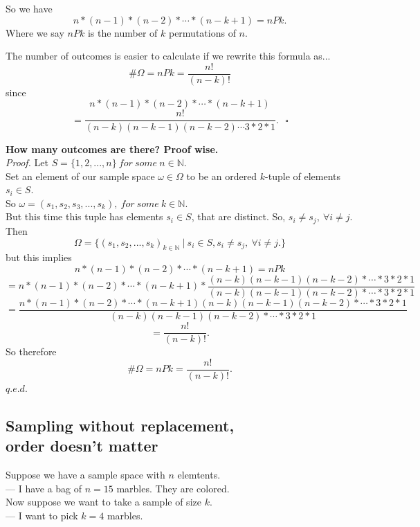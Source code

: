\documentclass[12pt]{book}
\begin{document}
So we have $$n*(n-1)*(n-2)* \cdots *(n-k+1) = nPk.$$
Where we say $nPk$ is the number of $k$ permutations of $n$.

The number of outcomes is easier to calculate if we rewrite this formula as...
$$\#\Omega = nPk = \frac{n!}{(n-k)!}$$
since 
$$n*(n-1)*(n-2)* \cdots *(n-k+1)$$
$$ = \frac{n!}{(n-k)(n-k-1)(n-k-2)\cdots 3*2*1}.~~~\square$$

\noindent \textbf{How many outcomes are there? Proof wise.}\\
\textit{Proof.}
Let $S=\{1,2,...,n\}~for~some~n\in \mathbb{N}$.\\
Set an element of our sample space $\omega \in \Omega$ to be an ordered $k$-tuple of elements $s_i \in S$.\\
So $\omega = (s_1, s_2, s_3,..., s_k), ~for~some~k\in \mathbb{N}$.\\
But this time this tuple has elements $s_i\in S$,  that are distinct. So, $s_i \neq s_j, ~\forall i\neq j.$\\
Then \\
$$\Omega = \big\{ (s_1, s_2, ..., s_k)_{k\in \mathbb{N}} ~\big|~ s_i \in S, s_i \neq s_j, ~\forall i\neq j. \big\}$$
but this implies
$$n*(n-1)*(n-2)* \cdots *(n-k+1) = nPk$$
$$\textstyle =n*(n-1)*(n-2)* \cdots *(n-k+1)*\frac{(n-k)(n-k-1)(n-k-2) *\cdots *3*2*1}{(n-k)(n-k-1)(n-k-2) *\cdots *3*2*1}$$
$$\textstyle =\frac{n*(n-1)*(n-2)* \cdots *(n-k+1)(n-k)(n-k-1)(n-k-2) *\cdots *3*2*1}{(n-k)(n-k-1)(n-k-2) *\cdots *3*2*1}$$
$$=\frac{n!}{(n-k)!}.$$
So therefore
$$ \#\Omega = nPk = \frac{n!}{(n-k)!}.$$\hfill$q.e.d.$
\newpage



\subsection{Sampling without replacement, \\ order doesn't matter}
Suppose we have a sample space with $n$ elemtents. \\
--- I have a bag of $n=15$ marbles. They are colored.\\
Now suppose we want to take a sample of size $k$. \\
--- I want to pick $k=4$ marbles.\\
\end{document}
